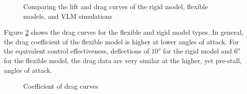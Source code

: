 \documentclass[11pt]{ucthesis}
\begin{document}
\begin{figure}
\hfill
{}
\hfill
{}
\hfill
\caption{Comparing the lift and drag curves of the rigid model, flexible models, and VLM simulations}
\label{fig:6}
\end{figure}

Figure \ref{fig:CD} shows the drag curves for the flexible and rigid model types. In general, the drag coefficient of the flexible model is higher at lower angles of attack.  For the equivalent control effectiveness, deflections of $10^o$ for the rigid model and $6^o$ for the flexible model, the drag data are very similar at the higher, yet pre-stall, angles of attack. 

\begin{figure}
\hfill
{}
\hfill
{}
\hfill
\caption{Coefficient of drag curves}
\label{fig:CD}
\end{figure}
\end{document}
